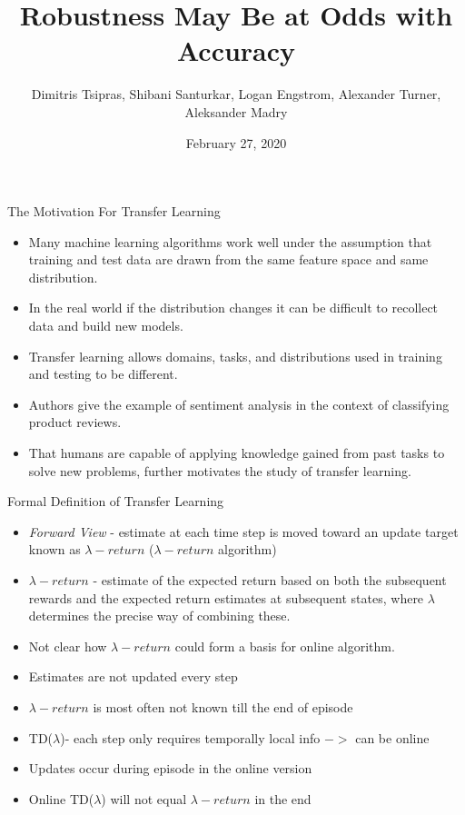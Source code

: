 \documentclass[xcolor={table}]{beamer}
\title[TD($\lambda$)]{Robustness May Be at Odds with Accuracy}
\author[Pan and Yang]{Dimitris Tsipras, Shibani Santurkar, Logan Engstrom,
Alexander Turner, Aleksander Madry}
\date{February 27, 2020}
\begin{document}
\begin{frame}
  \maketitle
\end{frame}

\begin{frame}{The Motivation For Transfer Learning}
    \begin{itemize}
        \item Many machine learning algorithms work well under the assumption that training and test data are drawn from the same feature space and same distribution.
        \item In the real world if the distribution changes it can be difficult to recollect data and build new models.
        \item Transfer learning allows domains, tasks, and distributions used in training and testing to be different.
        \item Authors give the example of sentiment analysis in the context of classifying product reviews.
        \item That humans are capable of applying knowledge gained from past tasks to solve new problems, further motivates the study of transfer learning.
    \end{itemize}
\end{frame}

\begin{frame}{Formal Definition of Transfer Learning}
    \begin{itemize}
        \item \textit{Forward View} - estimate at each time step is moved toward an update target known as $\lambda-return$ ($\lambda-return$ algorithm)
        \item $\lambda-return$ - estimate of the expected return based on both the subsequent rewards and the expected return estimates at subsequent states, where $\lambda$ determines the precise way of combining these.
        \item Not clear how $\lambda-return$ could form a basis for online algorithm.
        \item Estimates are not updated every step
        \item $\lambda-return$ is most often not known till the end of episode
        \item TD($\lambda$)- each step only requires temporally local info $->$ can be online%
        \item Updates occur during episode in the online version
        \item Online TD($\lambda$) will not equal $\lambda-return$ in the end
    \end{itemize}
\end{frame}
\end{document}
